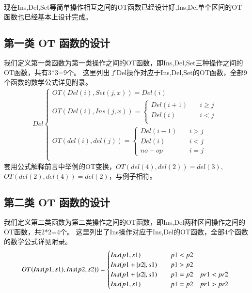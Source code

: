 现在Ins,Del,Set等简单操作相互之间的OT函数已经设计好,Ins,Del单个区间的OT函数也已经基本上设计完成。
\subsection{第一类 OT 函数的设计}
我们定义第一类函数为第一类操作之间的OT函数，即Ins,Del,Set三种操作之间的OT函数，共有3*3=9个。
这里列出了Del操作对应于Ins,Del,Set的OT函数，全部9个函数的数学公式详见附录。\cite{Sun:CSCW14}
\begin{equation}
\begin{aligned}
Del \begin{cases}
OT(Del (i), Set (j,x)) =
	{Del(i)}\\
OT(Del (i), Ins (j,x)) =\begin{cases}
	{Del (i+1)}  \quad &i \ge j\\
	{Del (i)}   \quad &i < j\\ \end{cases}\\
OT(del (i), del (j)) =\begin{cases}
	{Del (i-1)} \quad &i > j\\
	{Del (i)} \quad &i < j\\
	{no-op}   \quad &i = j \end{cases}\\
\end{cases}
\end{aligned}
\end{equation}
套用公式解释前言中举例的OT变换，$OT(del (4), del (2)) = del(3)$,$OT(del (2), del (4)) = del(2)$，与例子相符。

\subsection{第二类 OT 函数的设计}
我们定义第二类函数为第二类操作之间的OT函数，即Ins,Del两种区间操作之间的OT函数，共2*2=4个。
这里列出了Ins操作对应于Ins,Del的OT函数，全部4个函数的数学公式详见附录。\cite{Sun:CSCW17}
\begin{equation}
OT(Ins(p1,s1),Ins(p2,s2))= \begin{cases}
Ins(p1,s1) \quad & p1<p2 \\
Ins(p1+ |s2|,s1) \quad & p1>p2 \\
Ins(p1+ |s2|,s1) \quad & p1=p2 \quad pr1<pr2 \\
Ins(p1,s1) \quad & p1=p2 \quad pr1>pr2
 \end{cases}\\
\end{equation}


